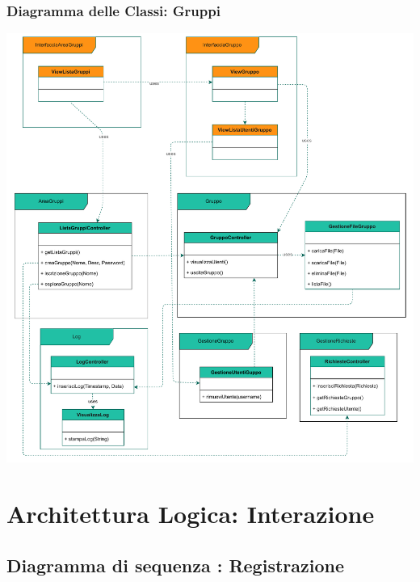 \subsubsection*{Diagramma delle Classi: Gruppi}
\vspace{0.5cm}


\vspace{0.5cm}
\begin{adjustwidth}{-2.5cm}{0cm}
\includegraphics[scale=0.75]{classi/Package-Classi-Gruppi.drawio.pdf}
\end{adjustwidth}





\section*{Architettura Logica: Interazione}
\vspace{0.5cm}


\subsection*{Diagramma di sequenza : Registrazione}
\vspace{0.5cm}

